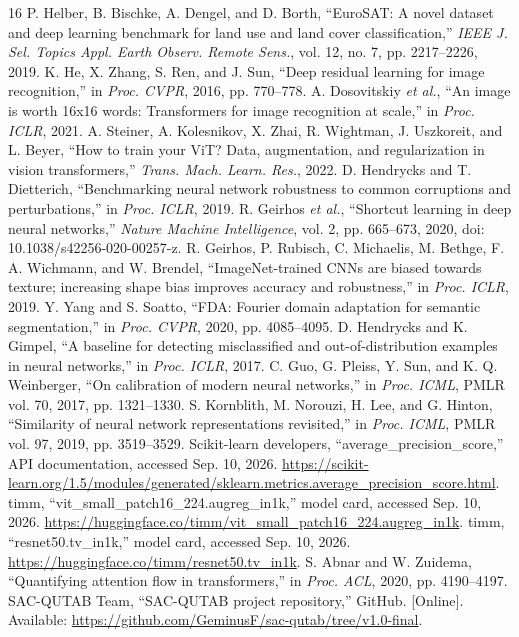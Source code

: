 \begin{thebibliography}{16}
 P. Helber, B. Bischke, A. Dengel, and D. Borth, ``EuroSAT: A novel dataset and deep learning benchmark for land use and land cover classification,'' \emph{IEEE J. Sel. Topics Appl. Earth Observ. Remote Sens.}, vol. 12, no. 7, pp. 2217--2226, 2019.
 K. He, X. Zhang, S. Ren, and J. Sun, ``Deep residual learning for image recognition,'' in \emph{Proc. CVPR}, 2016, pp. 770--778.
 A. Dosovitskiy \emph{et al.}, ``An image is worth 16x16 words: Transformers for image recognition at scale,'' in \emph{Proc. ICLR}, 2021.
 A. Steiner, A. Kolesnikov, X. Zhai, R. Wightman, J. Uszkoreit, and L. Beyer, ``How to train your ViT? Data, augmentation, and regularization in vision transformers,'' \emph{Trans. Mach. Learn. Res.}, 2022.
 D. Hendrycks and T. Dietterich, ``Benchmarking neural network robustness to common corruptions and perturbations,'' in \emph{Proc. ICLR}, 2019.
 R. Geirhos \emph{et al.}, ``Shortcut learning in deep neural networks,'' \emph{Nature Machine Intelligence}, vol. 2, pp. 665--673, 2020, doi: 10.1038/s42256-020-00257-z.
 R. Geirhos, P. Rubisch, C. Michaelis, M. Bethge, F. A. Wichmann, and W. Brendel, ``ImageNet-trained CNNs are biased towards texture; increasing shape bias improves accuracy and robustness,'' in \emph{Proc. ICLR}, 2019.
 Y. Yang and S. Soatto, ``FDA: Fourier domain adaptation for semantic segmentation,'' in \emph{Proc. CVPR}, 2020, pp. 4085--4095.
 D. Hendrycks and K. Gimpel, ``A baseline for detecting misclassified and out-of-distribution examples in neural networks,'' in \emph{Proc. ICLR}, 2017.
 C. Guo, G. Pleiss, Y. Sun, and K. Q. Weinberger, ``On calibration of modern neural networks,'' in \emph{Proc. ICML}, PMLR vol. 70, 2017, pp. 1321--1330.
 S. Kornblith, M. Norouzi, H. Lee, and G. Hinton, ``Similarity of neural network representations revisited,'' in \emph{Proc. ICML}, PMLR vol. 97, 2019, pp. 3519--3529.
 Scikit-learn developers, ``average\_precision\_score,'' API documentation, accessed Sep. 10, 2026. \url{https://scikit-learn.org/1.5/modules/generated/sklearn.metrics.average_precision_score.html}.
 timm, ``vit\_small\_patch16\_224.augreg\_in1k,'' model card, accessed Sep. 10, 2026. \url{https://huggingface.co/timm/vit_small_patch16_224.augreg_in1k}.
 timm, ``resnet50.tv\_in1k,'' model card, accessed Sep. 10, 2026. \url{https://huggingface.co/timm/resnet50.tv_in1k}.
 S. Abnar and W. Zuidema, ``Quantifying attention flow in transformers,'' in \emph{Proc. ACL}, 2020, pp. 4190--4197.
 SAC-QUTAB Team, ``SAC-QUTAB project repository,'' GitHub. [Online]. Available: \url{https://github.com/GeminusF/sac-qutab/tree/v1.0-final}.
\end{thebibliography}
